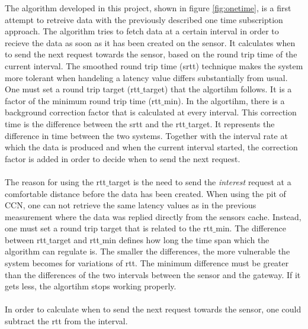 The algorithm developed in this project, shown in figure \ref{fig:onetime}, is a first attempt to retreive data with the previously described one time subscription approach. 
The algorithm tries to fetch data at a certain interval in order to recieve the data as soon as it has been created on the sensor. It calculates when to send the next request towards the sensor, based on the round trip time of the current interval. The smoothed round trip time (srtt) technique makes the system more tolerant when handeling a latency value differs substantially from usual. One must set a round trip target (rtt$\_$target) that the algortihm follows. It is a factor of the minimum round trip time (rtt$\_$min). In the algortihm, there is a background correction factor that is calculated at every interval. This correction time is the difference between the srtt and the rtt$\_$target. It represents the difference in time between the two systems. Together with the interval rate at which the data is produced and when the current interval started, the correction factor is added in order to decide when to send the next request. \\\\
The reason for using the rtt$\_$target is the need to send the \textit{interest} request at a comfortable distance before the data has been created.
When using the pit of CCN, one can not retrieve the same latency values as in the previous measurement where the data was replied directly from the sensors cache. Instead, one must set a round trip target that is related to the rtt$\_$min. The difference between rtt$\_$target and rtt$\_$min defines how long the time span which the algorithm can regulate is. The smaller the differences, the more vulnerable the system becomes for variations of rtt. The minimum difference must be greater than the differences of the two intervals between the sensor and the gateway. If it gets less, the algortihm stops working properly.\\\\
In order to calculate when to send the next request towards the sensor, one could subtract the rtt from the interval. 
